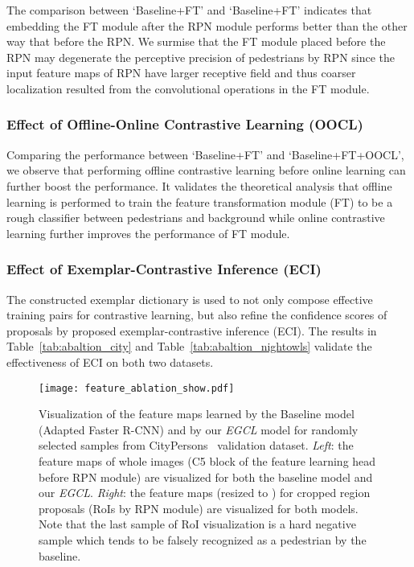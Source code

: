 \documentclass[journal]{IEEEtran}
\begin{document}
The comparison between `Baseline+FT' and `Baseline+FT' indicates that embedding the FT module after the RPN module performs better than the other way that before the RPN. We surmise that the FT module placed before the RPN may degenerate the perceptive precision of pedestrians by RPN since the input feature maps of RPN have larger receptive field and thus coarser localization resulted from the convolutional operations in the FT module.





\subsubsection{Effect of Offline-Online Contrastive Learning (OOCL)}
Comparing the performance between `Baseline+FT' and `Baseline+FT+OOCL', we observe that performing offline contrastive learning before online learning can further boost the performance. It validates the theoretical analysis that offline learning is performed to train the feature transformation module (FT) to be a rough classifier between pedestrians and background while online contrastive learning further improves the performance of FT module.

\subsubsection{Effect of Exemplar-Contrastive Inference (ECI)}
The constructed exemplar dictionary is used to not only compose effective training pairs for contrastive learning, but also refine the confidence scores of proposals by proposed exemplar-contrastive inference (ECI). The results in Table~\ref{tab:abaltion_city} and Table~\ref{tab:abaltion_nightowls} validate the effectiveness of ECI on both two datasets.
\begin{figure*}[!t]
\centering
    \texttt{[image: feature\_ablation\_show.pdf]}
\caption{Visualization of the feature maps learned by the Baseline model (Adapted Faster R-CNN) and by our \emph{EGCL} model for randomly selected samples from CityPersons~\cite{zhang2017citypersons} validation dataset. \emph{Left}: the feature maps of whole images (C5 block of the feature learning head  before RPN module) are visualized for both the baseline model and our \emph{EGCL}. \emph{Right}: the feature maps (resized to ) for cropped region proposals (RoIs by RPN module) are visualized for both models. Note that the last sample of RoI visualization is a hard negative sample which tends to be falsely recognized as a pedestrian by the baseline.} 
\label{Fig:qualitative_study_rois_no_ped}
\end{figure*}
\end{document}
